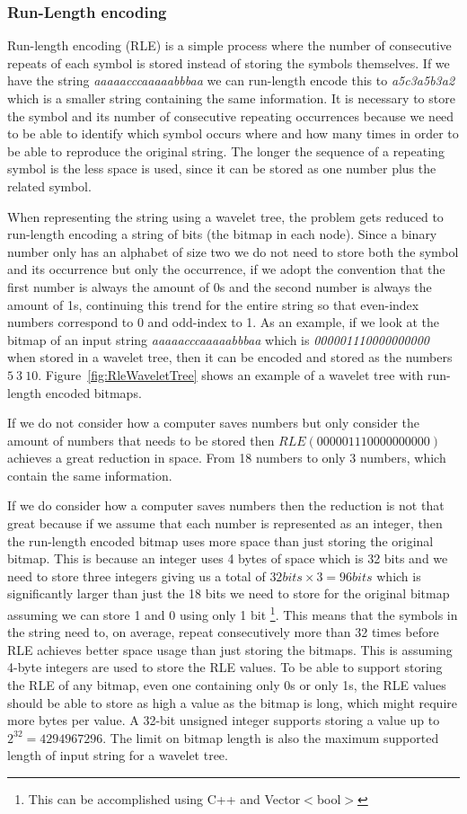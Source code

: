 \subsubsection{Run-Length encoding}
Run-length encoding (RLE) is a simple process where the number of consecutive repeats of each symbol is stored instead of storing the symbols themselves. 
If we have the string \textit{aaaaacccaaaaabbbaa} we can run-length encode this to \textit{a5c3a5b3a2} which is a smaller string containing the same information.
It is necessary to store the symbol and its number of consecutive repeating occurrences because we need to be able to identify which symbol occurs where and how many times in order to be able to reproduce the original string.
The longer the sequence of a repeating symbol is the less space is used, since it can be stored as one number plus the related symbol.

When representing the string using a wavelet tree, the problem gets reduced to run-length encoding a string of bits (the bitmap in each node).
Since a binary number only has an alphabet of size two we do not need to store both the symbol and its occurrence but only the occurrence, if we adopt the convention that the first number is always the amount of 0s and the second number is always the amount of 1s, continuing this trend for the entire string so that even-index numbers correspond to 0 and odd-index to 1. 
As an example, if we look at the bitmap of an input string \textit{aaaaacccaaaaabbbaa} which is \textit{000001110000000000} when stored in a wavelet tree, then it can be encoded and stored as the numbers $5~3~10$.
Figure~\ref{fig:RleWaveletTree} shows an example of a wavelet tree with run-length encoded bitmaps.

If we do not consider how a computer saves numbers but only consider the amount of numbers that needs to be stored then $RLE(000001110000000000)$ achieves a great reduction in space.
From 18 numbers to only 3 numbers, which contain the same information.

If we do consider how a computer saves numbers then the reduction is not that great because if we assume that each number is represented as an integer, then the run-length encoded bitmap uses more space than just storing the original bitmap. 
This is because an integer uses 4 bytes of space which is 32 bits and we need to store three integers giving us a total of $32 bits \times 3 = 96 bits$ which is significantly larger than just the 18 bits we need to store for the original bitmap assuming we can store 1 and 0 using only 1 bit \footnote{This can be accomplished using C++ and Vector$<$bool$>$}. 
This means that the symbols in the string need to, on average, repeat consecutively more than 32 times before RLE achieves better space usage than just storing the bitmaps.
This is assuming 4-byte integers are used to store the RLE values. 
To be able to support storing the RLE of any bitmap, even one containing only 0s or only 1s, the RLE values should be able to store as high a value as the bitmap is long, which might require more bytes per value.
A 32-bit unsigned integer supports storing a value up to $2^{32} = \num{4294967296}$. 
The limit on bitmap length is also the maximum supported length of input string for a wavelet tree.

